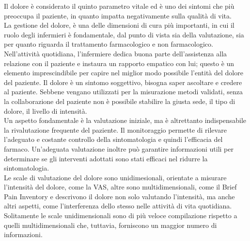 Il dolore è considerato il quinto parametro vitale ed è uno dei sintomi che più preoccupa il paziente, 
in quanto impatta negativamente sulla qualità di vita.\\ La gestione del dolore, 
è una delle dimensioni di cura più importanti, in cui il ruolo degli infermieri è fondamentale, 
dal punto di vista sia della valutazione, sia per quanto riguarda il trattamento farmacologico e non farmacologico.\\
Nell'attività quotidiana, l'infermiere dedica buona parte dell'assistenza alla relazione con il paziente e instaura 
un rapporto empatico con lui; questo è un elemento imprescindibile per capire nel miglior modo possibile l'entità del 
dolore del paziente. Il dolore è un sintomo soggettivo, bisogna saper ascoltare e credere al paziente. Sebbe­ne vengano 
utilizzati per la misurazione metodi validati, senza la collabo­razione del paziente non è possibile stabilire 
la giusta sede, il tipo di dolo­re, il livello di intensità.\\
Un aspetto fondamentale è la valutazione iniziale, ma è altret­tanto indispensabile la rivalutazione frequente del paziente. 
Il monitorag­gio permette di rilevare l'adeguato e costante controllo della sintomatolo­gia e quindi l'efficacia del farmaco. 
Un'adeguata valutazione inoltre può garantire informazioni utili per determinare se gli interventi adottati sono 
stati effi­caci nel ridurre la sintomatologia.\\ 
Le scale di valutazione del dolore sono unidimesionali, orientate a misurare l’intensità del dolore, come la VAS, 
altre sono multidimensionali, come il Brief Pain Inventory e descrivono il dolore non solo valutando l'intensità, 
ma anche altri aspetti, come l’interferenza dello stesso nelle attività di vita quotidiana. Solitamente le scale 
unidimensionali sono di più veloce compila­zione rispetto a quelli multidimensionali che, tuttavia, forniscono 
un maggior numero di informazioni.\\ 

